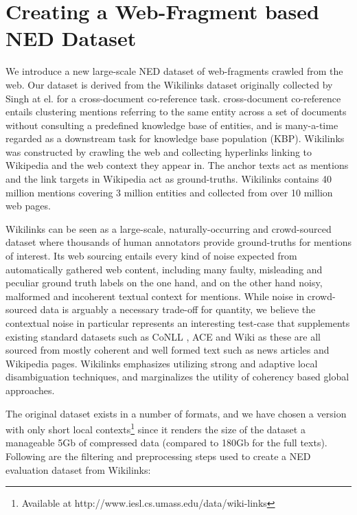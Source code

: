 \documentclass[11pt]{article}
\begin{document}
	\section{\label{sec:w}Creating a Web-Fragment based NED Dataset}
	We introduce a new large-scale NED dataset of web-fragments crawled from the web. Our dataset is derived from the Wikilinks dataset originally collected by Singh at el.  for a cross-document co-reference task. cross-document co-reference entails clustering mentions referring to the same entity across a set of documents without consulting a predefined knowledge base of entities, and is many-a-time regarded as a downstream task for knowledge base population (KBP). Wikilinks was constructed by crawling the web and collecting hyperlinks linking to Wikipedia and the web context they appear in. The anchor texts act as mentions and the link targets in Wikipedia act as ground-truths. Wikilinks contains 40 million mentions covering 3 million entities and collected from over 10 million web pages.
	
	Wikilinks can be seen as a large-scale, naturally-occurring and crowd-sourced dataset where thousands of human annotators provide ground-truths for mentions of interest. Its web sourcing entails every kind of noise expected from automatically gathered web content, including many faulty, misleading and peculiar ground truth labels on the one hand, and on the other hand noisy, malformed and incoherent textual context for mentions. While noise in crowd-sourced data is arguably a necessary trade-off for quantity, we believe the contextual noise in particular represents an interesting test-case that supplements existing standard datasets such as CoNLL \cite{hoffart2011robust}, ACE and Wiki \cite{ratinov2011local} as these are all sourced from mostly coherent and well formed text such as news articles and Wikipedia pages. Wikilinks emphasizes utilizing strong and adaptive local disambiguation techniques, and marginalizes the utility of coherency based global approaches.
	
	The original dataset exists in a number of formats, and we have chosen a version with only short local contexts\footnote{Available at http://www.iesl.cs.umass.edu/data/wiki-links} since it renders the size of the dataset a manageable 5Gb of compressed data (compared to 180Gb for the full texts). Following are the filtering and preprocessing steps used to create a NED evaluation dataset from Wikilinks:
	
\end{document}
